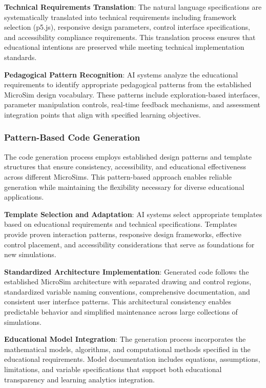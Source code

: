 \textbf{Technical Requirements Translation}: The natural language specifications are systematically translated into technical requirements including framework selection (p5.js), responsive design parameters, control interface specifications, and accessibility compliance requirements. This translation process ensures that educational intentions are preserved while meeting technical implementation standards.

\textbf{Pedagogical Pattern Recognition}: AI systems analyze the educational requirements to identify appropriate pedagogical patterns from the established MicroSim design vocabulary. These patterns include exploration-based interfaces, parameter manipulation controls, real-time feedback mechanisms, and assessment integration points that align with specified learning objectives.

\subsubsection{Pattern-Based Code Generation}

The code generation process employs established design patterns and template structures that ensure consistency, accessibility, and educational effectiveness across different MicroSims. This pattern-based approach enables reliable generation while maintaining the flexibility necessary for diverse educational applications.

\textbf{Template Selection and Adaptation}: AI systems select appropriate templates based on educational requirements and technical specifications. Templates provide proven interaction patterns, responsive design frameworks, effective control placement, and accessibility considerations that serve as foundations for new simulations.

\textbf{Standardized Architecture Implementation}: Generated code follows the established MicroSim architecture with separated drawing and control regions, standardized variable naming conventions, comprehensive documentation, and consistent user interface patterns. This architectural consistency enables predictable behavior and simplified maintenance across large collections of simulations.

\textbf{Educational Model Integration}: The generation process incorporates the mathematical models, algorithms, and computational methods specified in the educational requirements. Model documentation includes equations, assumptions, limitations, and variable specifications that support both educational transparency and learning analytics integration.

